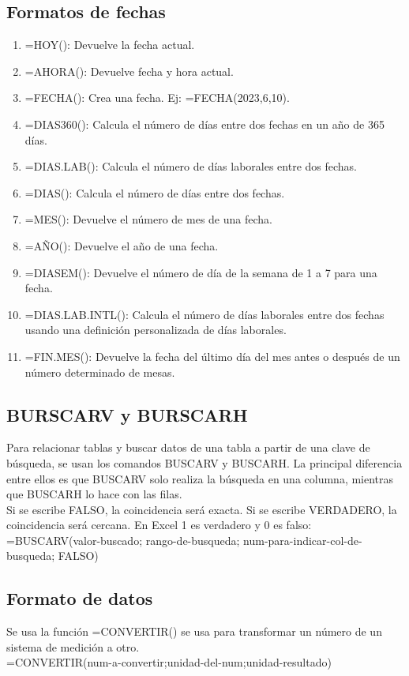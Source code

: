 \documentclass[a4paper, 12pt]{book}
\begin{document}
\subsection{Formatos de fechas}
\begin{enumerate}
\item =HOY(): Devuelve la fecha actual.
\item =AHORA(): Devuelve fecha y hora actual.
\item =FECHA(): Crea una fecha. Ej: =FECHA(2023,6,10).
\item =DIAS360(): Calcula el número de días entre dos fechas en un año de 365 días.
\item =DIAS.LAB(): Calcula el número de días laborales entre dos fechas.
\item =DIAS(): Calcula el número de días entre dos fechas.
\item =MES(): Devuelve el número de mes de una fecha.
\item =AÑO(): Devuelve el año de una fecha.
\item =DIASEM(): Devuelve el número de día de la semana de 1 a 7 para una fecha.
\item =DIAS.LAB.INTL(): Calcula el número de días laborales entre dos fechas usando una definición personalizada de días laborales.
\item =FIN.MES(): Devuelve la fecha del último día del mes antes o después de un número determinado de mesas.
\end{enumerate}
\subsection{BURSCARV y BURSCARH}
Para relacionar tablas y buscar datos de una tabla a partir de una clave de búsqueda, se usan los comandos BUSCARV y BUSCARH. La principal diferencia entre ellos es que BUSCARV solo realiza la búsqueda en una columna, mientras que BUSCARH lo hace con las filas. \\
Si se escribe FALSO, la coincidencia será exacta. Si se escribe VERDADERO, la coincidencia será cercana. En Excel 1 es verdadero y 0 es falso: \\
=BUSCARV(valor-buscado; rango-de-busqueda; num-para-indicar-col-de-busqueda; FALSO)
\subsection{Formato de datos}
Se usa la función =CONVERTIR() se usa para transformar un número de un sistema de medición a otro. \\
=CONVERTIR(num-a-convertir;unidad-del-num;unidad-resultado) \\
\end{document}
